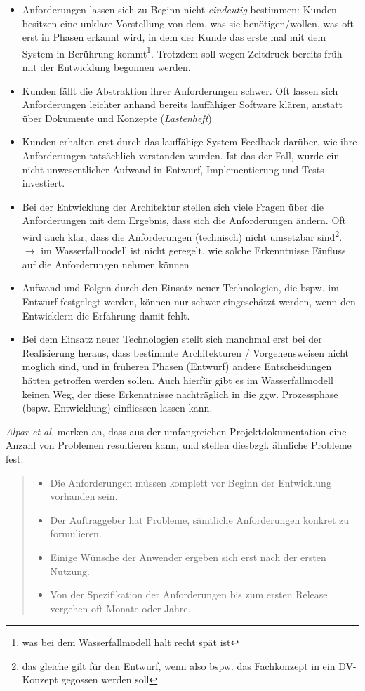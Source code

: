 \begin{itemize}
    \item Anforderungen lassen sich zu Beginn nicht \textit{eindeutig} bestimmen: Kunden besitzen eine unklare Vorstellung von dem, was sie benötigen/wollen, was oft erst in Phasen erkannt wird, in dem der Kunde das erste mal mit dem System in Berührung kommt\footnote{
    was bei dem Wasserfallmodell halt recht spät ist
    }.
    Trotzdem soll wegen Zeitdruck bereits früh mit der Entwicklung begonnen werden.
    \item Kunden fällt die Abstraktion ihrer Anforderungen schwer.
    Oft lassen sich Anforderungen leichter anhand bereits lauffähiger Software klären, anstatt über Dokumente und Konzepte (\textit{Lastenheft})
    \item Kunden erhalten erst durch das lauffähige System Feedback darüber, wie ihre Anforderungen tatsächlich verstanden wurden.
    Ist das der Fall, wurde ein nicht unwesentlicher Aufwand in Entwurf, Implementierung und Tests investiert.
    \item Bei der Entwicklung der Architektur stellen sich viele Fragen über die Anforderungen mit dem Ergebnis, dass sich die Anforderungen ändern.
    Oft wird auch klar, dass die Anforderungen (technisch) nicht umsetzbar sind\footnote{
     das gleiche gilt für den Entwurf, wenn also bspw. das Fachkonzept in ein DV-Konzept gegossen werden soll
    }.
    $\rightarrow$ im Wasserfallmodell ist nicht geregelt, wie solche Erkenntnisse Einfluss auf die Anforderungen nehmen können
    \item Aufwand und Folgen durch den Einsatz neuer Technologien, die bspw. im Entwurf festgelegt werden, können nur schwer eingeschätzt werden, wenn den Entwicklern die Erfahrung damit fehlt.
    \item Bei dem Einsatz neuer Technologien stellt sich manchmal erst bei der Realisierung heraus, dass bestimmte Architekturen / Vorgehensweisen nicht möglich sind, und in früheren Phasen (Entwurf) andere Entscheidungen hätten getroffen werden sollen.
    Auch hierfür gibt es im Wasserfallmodell keinen Weg, der diese Erkenntnisse nachträglich in die ggw. Prozessphase (bspw. Entwicklung) einfliessen lassen kann.
\end{itemize}

\textit{Alpar et al.} merken an, dass aus der umfangreichen Projektdokumentation eine Anzahl von Problemen resultieren kann, und stellen diesbzgl. ähnliche Probleme fest:

\blockquote[{\cite[323]{AABG14n}}]{
    \begin{itemize}
        \item Die Anforderungen müssen komplett vor Beginn der Entwicklung vorhanden
        sein.
        \item Der Auftraggeber hat Probleme, sämtliche Anforderungen konkret zu formulieren.
        \item Einige Wünsche der Anwender ergeben sich erst nach der ersten Nutzung.
        \item Von der Spezifikation der Anforderungen bis zum ersten Release vergehen oft
        Monate oder Jahre.
    \end{itemize}
}